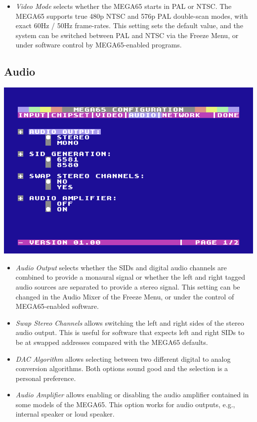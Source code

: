\begin{itemize}
  \item{\em Video Mode} selects whether the MEGA65 starts in PAL or NTSC.    The MEGA65 supports true 480p NTSC and 576p PAL double-scan modes, with exact 60Hz / 50Hz frame-rates. This setting sets the default value, and the system can be switched between PAL and NTSC via the Freeze Menu, or under software control by MEGA65-enabled programs.
\end{itemize}

\subsection{Audio}

\begin{center}
\includegraphics[width=0.7\linewidth]{images/ss-m65config-4.png}
\end{center}

\begin{itemize}
  \item{\em Audio Output} selects whether the SIDs and digital audio channels are combined to provide a monaural signal or whether the left and right tagged audio sources are separated to provide a stereo signal. This setting can be changed in the Audio Mixer of the Freeze Menu, or under the control of MEGA65-enabled software.
  \item{\em Swap Stereo Channels} allows switching the left and right sides of the stereo audio output. This is useful for software that expects left and right SIDs to be at swapped addresses compared with the MEGA65 defaults.
  \item{\em DAC Algorithm} allows selecting between two different digital to analog conversion algorithms. Both options sound good and the selection is a personal preference.
  \item{\em Audio Amplifier} allows enabling or disabling the audio amplifier contained in some models of the MEGA65. This option works for audio outputs, e.g., internal speaker or loud speaker.
\end{itemize}

